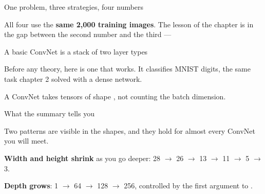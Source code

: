 \documentclass[aspectratio=169,11pt,t]{beamer}
\begin{document}
\begin{frame}{One problem, three strategies, four numbers}
\begin{minipage}[t]{0.241\textwidth}
\end{minipage}%
\hfill
\begin{minipage}[t]{0.241\textwidth}
\end{minipage}%
\hfill
\begin{minipage}[t]{0.241\textwidth}
\end{minipage}%
\hfill
\begin{minipage}[t]{0.241\textwidth}
\end{minipage}%
{\fontsize{9.4}{12.6}\selectfont\color{fg2}All four use the \textbf{same 2,000 training images}. The lesson of the chapter is in the gap between the second number and the third --- \par}\vskip 4pt
\end{frame}


\begin{frame}[shrink=25]{A basic ConvNet is a stack of two layer types}
{\fontsize{9.4}{12.6}\selectfont\color{fg2}Before any theory, here is one that works. It classifies MNIST digits, the same task chapter 2 solved with a dense network.\par}\vskip 4pt
{\fontsize{9.4}{12.6}\selectfont\color{fg2}A ConvNet takes tensors of shape , not counting the batch dimension.\par}\vskip 4pt
\end{frame}

\begin{frame}[shrink=25]{What the summary tells you}
{\fontsize{9.4}{12.6}\selectfont\color{fg2}Two patterns are visible in the shapes, and they hold for almost every ConvNet you will meet.\par}\vskip 4pt
\begin{ibullets}
\item \textbf{Width and height shrink} as you go deeper: 28 $\rightarrow$ 26 $\rightarrow$ 13 $\rightarrow$ 11 $\rightarrow$ 5 $\rightarrow$ 3.
\item \textbf{Depth grows}: 1 $\rightarrow$ 64 $\rightarrow$ 128 $\rightarrow$ 256, controlled by the first argument to .
\end{ibullets}
\end{frame}
\end{document}

